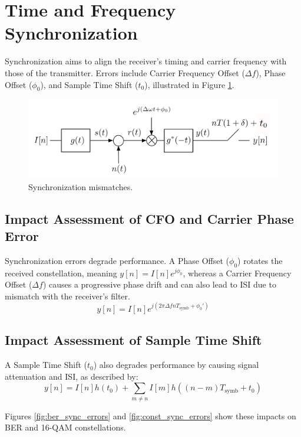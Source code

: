 \documentclass[11pt]{article}
\begin{document}
	\section{Time and Frequency Synchronization}
	Synchronization aims to align the receiver's timing and carrier frequency with those of the transmitter. Errors include Carrier Frequency Offset ($\Delta f$), Phase Offset ($\phi_0$), and Sample Time Shift ($t_0$), illustrated in Figure \ref{fig:sync-errors-conceptual}.
			
	\begin{figure}[H]
		\centering
		\includegraphics[width=0.6\linewidth]{Images/sync-errors-conceptual} 
		\caption{Synchronization mismatches.}
		\label{fig:sync-errors-conceptual}
	\end{figure}
	
	\subsection{Impact Assessment of CFO and Carrier Phase Error}
	Synchronization errors degrade performance. A Phase Offset ($\phi_0$) rotates the received constellation, meaning $y[n] = I[n]e^{j\phi_0}$, whereas a Carrier Frequency Offset ($\Delta f$) causes a progressive phase drift and can also lead to ISI due to mismatch with the receiver's filter. 
	\begin{equation} y[n] = I[n]e^{j(2\pi \Delta f nT_{\text{symb}} + \phi_0')} \end{equation}
	
	
	\subsection{Impact Assessment of Sample Time Shift}
	A Sample Time Shift ($t_0$) also degrades performance by causing signal attenuation and ISI, as described by:
	\begin{equation} y[n] = I[n]h(t_0) + \sum_{m \neq n} I[m]h((n-m)T_{\text{symb}} + t_0) \end{equation}
	
	Figures \ref{fig:ber_sync_errors} and \ref{fig:const_sync_errors} show these impacts on BER and 16-QAM constellations.
				
\end{document}
